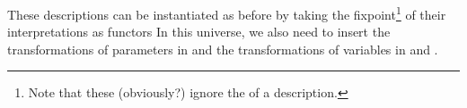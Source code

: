 These descriptions can be instantiated as before by taking the fixpoint\footnote{Note that these (obviously?) ignore the  of a description.}
of their interpretations as functors
In this universe, we also need to insert the transformations of parameters  in  and the transformations of variables  in  and .


